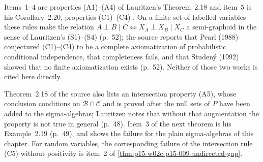 Items~1--4 are properties (A1)--(A4) of Lauritzen's Theorem~2.18 and
item~5 is his Corollary~2.20, properties (C1)--(C4)
\cite[pp.~48--49]{Lauritzen2019GraphicalLectures2020}. On a finite set of
labelled variables these rules make the relation
\(A\perp B\mid C\Leftrightarrow X_A\perp X_B\mid X_C\) a semi-graphoid in
the sense of Lauritzen's (S1)--(S4) (p.~52); the source reports that
Pearl (1988) conjectured (C1)--(C4) to be a complete axiomatization of
probabilistic conditional independence, that completeness fails, and that
Studen\'y (1992) showed that no finite axiomatization exists (p.~52). Neither
of those two works is cited here directly.

Theorem~2.18 of the source also lists an intersection property (A5), whose
conclusion conditions on \(\mathcal B\cap\mathcal C\) and is proved after
the null sets of \(P\) have been added to the sigma-algebras; Lauritzen
notes that without that augmentation the property is not true in general
(p.~48). Item~3 of the next theorem is his Example~2.19 (p.~49), and shows
the failure for the plain sigma-algebras of this chapter. For random
variables, the corresponding failure of the intersection rule (C5)
without positivity is item~2 of \cref{thm:p15-w02c-p15-009-undirected-gap}.


